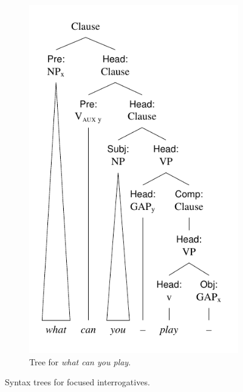 \begin{figure}[htbp]
\begin{subfigure}[b]{0.48\textwidth}
    \includegraphics[width=\textwidth]{figures/what-can-you-tree.pdf}
    \caption{Tree for \textit{what can you play}.}
    \label{fig:what-can-you}
  \end{subfigure}
  \caption{Syntax trees for focused interrogatives.}
  \label{fig:combined-trees2}
\end{figure}



